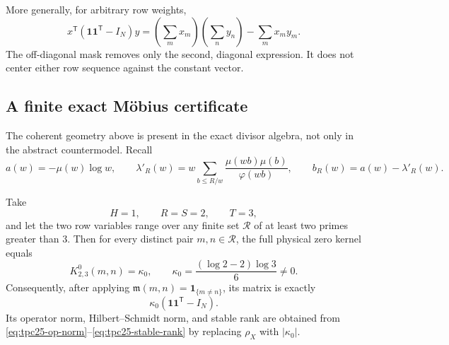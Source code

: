 More generally, for arbitrary row weights,
\begin{equation}
 x^{\mathsf T}(\mathbf1\mathbf1^{\mathsf T}-I_N)y
 =\left(\sum_mx_m\right)\left(\sum_ny_n\right)
 -\sum_mx_my_m.
 \label{eq:tpc25-principal-row-identity}
\end{equation}
The off-diagonal mask removes only the second, diagonal expression.  It
does not center either row sequence against the constant vector.

\subsection{A finite exact M\"obius certificate}

The coherent geometry above is present in the exact divisor algebra,
not only in the abstract countermodel.  Recall
\begin{equation}
 a(w)=-\mu(w)\log w,
 \qquad
 \lambda'_R(w)
 =w\sum_{b\le R/w}
 \frac{\mu(wb)\mu(b)}{\varphi(wb)},
 \qquad
 b_R(w)=a(w)-\lambda'_R(w).
 \label{eq:tpc25-divisor-coefficients}
\end{equation}

\begin{proposition}
\label{prop:tpc25-finite-constant-kernel}
Take
\begin{equation}
 H=1,\qquad R=S=2,\qquad T=3,
 \label{eq:tpc25-finite-scales}
\end{equation}
and let the two row variables range over any finite set
\(\mathcal R\) of at least two primes greater than \(3\).  Then for
every distinct pair \(m,n\in\mathcal R\), the full physical zero
kernel equals
\begin{equation}
 K^0_{2,3}(m,n)
 =\kappa_0,
 \qquad
 \boxed{\kappa_0=
 \frac{(\log2-2)\log3}{6}\ne0.}
 \label{eq:tpc25-kappa-zero}
\end{equation}
Consequently, after applying
\(\mathfrak m(m,n)=\mathbf 1_{\{m\ne n\}}\), its matrix is exactly
\begin{equation}
 \kappa_0(\mathbf1\mathbf1^{\mathsf T}-I_N).
 \label{eq:tpc25-exact-mobius-matrix}
\end{equation}
Its operator norm, Hilbert--Schmidt norm, and stable rank are obtained
from \eqref{eq:tpc25-op-norm}--\eqref{eq:tpc25-stable-rank} by replacing
\(\rho_X\) with \(|\kappa_0|\).
\end{proposition}

